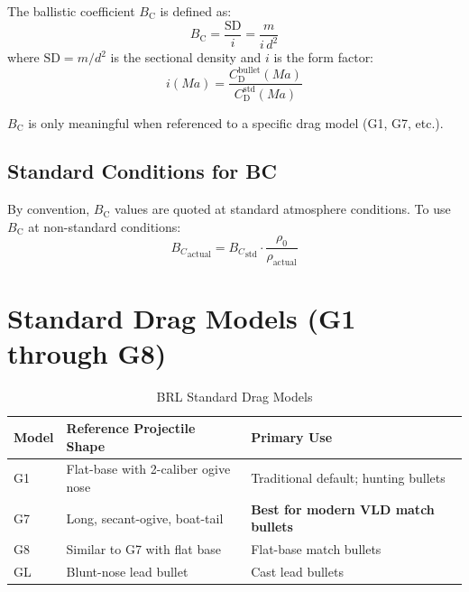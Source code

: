 \documentclass[11pt,twoside,openright]{report}
\newcommand{\Cd}{C_{\mathrm{D}}}
\newcommand{\Bc}{B_{\mathrm{C}}}
\newcommand{\Mach}{\mathit{Ma}}
\newcommand{\sd}{\mathrm{SD}}
\begin{document}
The ballistic coefficient $\Bc$ is defined as:
\begin{equation}
  \boxed{\Bc = \frac{\sd}{i} = \frac{m}{i\,d^2}}
  \label{eq:bc_definition}
\end{equation}
where $\sd = m/d^2$ is the sectional density and $i$ is the form factor:
\begin{equation}
  i(\Mach) = \frac{\Cd^{\mathrm{bullet}}(\Mach)}{\Cd^{\mathrm{std}}(\Mach)}
  \label{eq:form_factor}
\end{equation}

$\Bc$ is only meaningful when referenced to a specific drag model (G1, G7, etc.).

\subsection{Standard Conditions for BC}

By convention, $\Bc$ values are quoted at standard atmosphere conditions. To use $\Bc$ at non-standard conditions:
\begin{equation}
  {B_C}_{\mathrm{actual}} = {B_C}_{\mathrm{std}} \cdot \frac{\rho_0}{\rho_{\mathrm{actual}}}
  \label{eq:bc_density_correction}
\end{equation}

\section{Standard Drag Models (G1 through G8)}
\label{sec:drag_models}

\begin{table}[H]
\centering
\caption{BRL Standard Drag Models \citep{mccoy1999modern, ingalls1893exterior}}
\label{tab:drag_models}
\begin{tabularx}{\textwidth}{@{}lXl@{}}
\toprule
\textbf{Model} & \textbf{Reference Projectile Shape} & \textbf{Primary Use} \\
\midrule
G1 & Flat-base with 2-caliber ogive nose & Traditional default; hunting bullets \\
G7 & Long, secant-ogive, boat-tail & \textbf{Best for modern VLD match bullets} \\
G8 & Similar to G7 with flat base & Flat-base match bullets \\
GL & Blunt-nose lead bullet & Cast lead bullets \\
\bottomrule
\end{tabularx}
\end{table}
\end{document}
